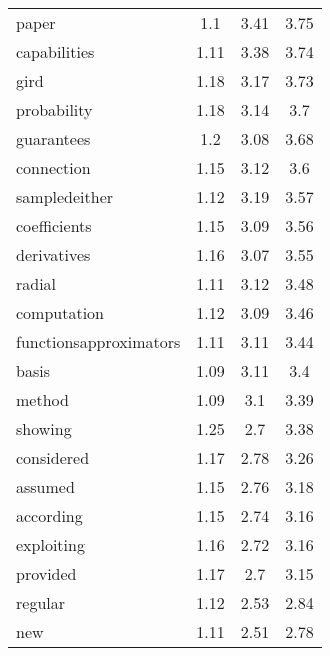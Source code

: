 \documentclass[3p]{elsarticle}
\begin{document}
\begin{tcolorbox}
\begin{center}
\begin{tabular}{lccc}
            paper                  & 1.1    & 3.41    & 3.75  \\
            capabilities           & 1.11   & 3.38    & 3.74  \\
            gird                   & 1.18   & 3.17    & 3.73  \\
            probability            & 1.18   & 3.14    & 3.7   \\
            guarantees             & 1.2    & 3.08    & 3.68  \\
            connection             & 1.15   & 3.12    & 3.6   \\
            sampledeither          & 1.12   & 3.19    & 3.57  \\
            coefficients           & 1.15   & 3.09    & 3.56  \\
            derivatives            & 1.16   & 3.07    & 3.55  \\
            radial                 & 1.11   & 3.12    & 3.48  \\
            computation            & 1.12   & 3.09    & 3.46  \\
            functionsapproximators & 1.11   & 3.11    & 3.44  \\
            basis                  & 1.09   & 3.11    & 3.4   \\
            method                 & 1.09   & 3.1     & 3.39  \\
            showing                & 1.25   & 2.7     & 3.38  \\
            considered             & 1.17   & 2.78    & 3.26  \\
            assumed                & 1.15   & 2.76    & 3.18  \\
            according              & 1.15   & 2.74    & 3.16  \\
            exploiting             & 1.16   & 2.72    & 3.16  \\
            provided               & 1.17   & 2.7     & 3.15  \\
            regular                & 1.12   & 2.53    & 2.84  \\
            new                    & 1.11   & 2.51    & 2.78 \\
            \hline
        \end{tabular}
\end{center}
\end{tcolorbox}
\end{document}

